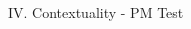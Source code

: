 \documentclass[final,hyperref={pdfpagelabels=false}]{beamer}
\begin{document}
\begin{frame}[t]
\begin{columns}[c]
\begin{column}{.69\textwidth}
\begin{columns}[c]
\begin{column}{.46\textwidth}
\begin{block}{IV. Contextuality - PM Test}
          \end{block}

        \end{column}

        \begin{column}{.015\textwidth}\end{column} %
      \end{columns}






      \begin{columns}[c]

        \begin{column}{.005\textwidth}\end{column} %
        \begin{column}{.94\textwidth} %


\end{column}
\end{columns}
\end{column}
\end{columns}
\end{frame}
\end{document}
